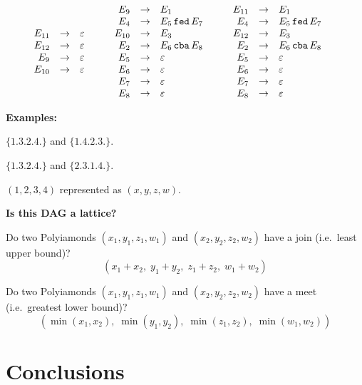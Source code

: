 \documentclass[a4paper,12pt]{article}
\begin{document}
\[\begin{array}{l}
\begin{array}{c@{\qquad}c@{\qquad}c@{\qquad}c@{\qquad}c}
\begin{array}{rcl}
E_{11}   &\to& \varepsilon\\
E_{12}   &\to& \varepsilon\\
E_9      &\to& \varepsilon\\
E_{10}   &\to& \varepsilon
\end{array}
&
\begin{array}{rcl}
E_9      &\to& E_1\\
E_4      &\to& E_5\,\mathtt{f}\mathtt{e}\mathtt{d}\,E_7\\
E_{10}   &\to& E_3\\
E_2      &\to& E_6\,\mathtt{c}\mathtt{b}\mathtt{a}\,E_8\\
E_5      &\to& \varepsilon\\
E_6      &\to& \varepsilon\\
E_7      &\to& \varepsilon\\
E_8      &\to& \varepsilon
\end{array}
&
\begin{array}{rcl}
E_{11}   &\to& E_1\\
E_4      &\to& E_5\,\mathtt{f}\mathtt{e}\mathtt{d}\,E_7\\
E_{12}   &\to& E_3\\
E_2      &\to& E_6\,\mathtt{c}\mathtt{b}\mathtt{a}\,E_8\\
E_5      &\to& \varepsilon\\
E_6      &\to& \varepsilon\\
E_7      &\to& \varepsilon\\
E_8      &\to& \varepsilon
\end{array}
\end{array}
\end{array}
\]


{\bf Examples:}

$\{1. 3. 2. 4.\}$ and $\{1. 4. 2. 3.\}$. 

$\{1. 3. 2. 4.\}$ and $\{2. 3. 1. 4.\}$.

$(1, 2, 3, 4)$ represented as $(x, y, z, w)$.




{\bf Is this DAG a lattice?}

Do two Polyiamonds $(x_1,y_1,z_1,w_1)$ and $(x_2,y_2,z_2,w_2)$ have a join
(i.e.\ least upper bound)?
\[
(x_1+x_2,\; y_1+y_2,\; z_1+z_2,\; w_1+w_2)
\]

Do two Polyiamonds $(x_1,y_1,z_1,w_1)$ and $(x_2,y_2,z_2,w_2)$ have a meet
(i.e.\ greatest lower bound)?
\[
(\min(x_1,x_2),\; \min(y_1,y_2),\; \min(z_1,z_2),\; \min(w_1,w_2))
\]


\section{Conclusions}
\end{document}
